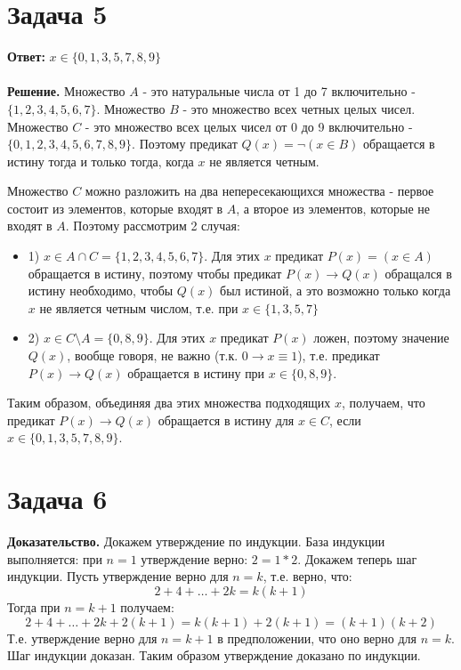 \documentclass{article}
\begin{document}
\section*{Задача 5}
{\bf Ответ:} $x\in\{0, 1, 3, 5, 7, 8, 9\}$
 \\
 \\
{\bf Решение.} Множество $A$ - это натуральные числа от 1 до 7 включительно - $\{1,2,3,4,5,6,7\}$. Множество $B$ - это множество всех четных целых чисел. Множество $C$ - это множество всех целых чисел от 0 до 9 включительно - $\{0,1,2,3,4,5,6,7,8,9\}$. Поэтому предикат $Q(x) = \neg(x \in B)$ обращается в истину тогда и только тогда, когда $x$ не является четным.
\par
Множество $C$ можно разложить на два непересекающихся множества - первое состоит из элементов, которые входят в $A$, а второе из элементов, которые не входят в $A$. Поэтому рассмотрим 2 случая:
\begin{itemize}
    \item 1) $x\in A\cap C = \{1,2,3,4,5,6,7\}$. Для этих $x$ предикат $P(x) = (x\in A)$ обращается в истину, поэтому чтобы предикат $P(x)\rightarrow Q(x)$ обращался в истину необходимо, чтобы $Q(x)$ был истиной, а это возможно только когда $x$ не является четным числом, т.е. при $x\in \{1,3,5,7\}$
    \item  2) $x\in C\setminus A=\{0,8,9\}$. Для этих $x$ предикат $P(x)$ ложен, поэтому значение $Q(x)$, вообще говоря, не важно (т.к. $0\rightarrow x\equiv 1$), т.е. предикат $P(x)\rightarrow Q(x)$ обращается в истину при $x\in\{0,8,9\}$.
\end{itemize}
\par
Таким образом, объединяя два этих множества подходящих $x$, получаем, что предикат $P(x)\rightarrow Q(x)$ обращается в истину для $x\in C$, если  $x\in\{0,1,3,5,7,8,9\}$.
\section*{Задача 6}
{\bf Доказательство.} Докажем утверждение по индукции. База индукции выполняется: при $n=1$ утверждение верно: $2 = 1 * 2$. Докажем теперь шаг индукции. 
Пусть утверждение верно для $n=k$, т.е. верно, что: $$2+4+\dots+2k=k(k+1)$$
Тогда при $n=k+1$ получаем: $$2+4+\dots+2k+2(k+1)=k(k+1)+2(k+1)=(k+1)(k+2)$$
Т.е. утверждение верно для $n=k+1$ в предположении, что оно верно для $n=k$. Шаг индукции доказан.  Таким образом утверждение доказано по индукции.
\end{document}
